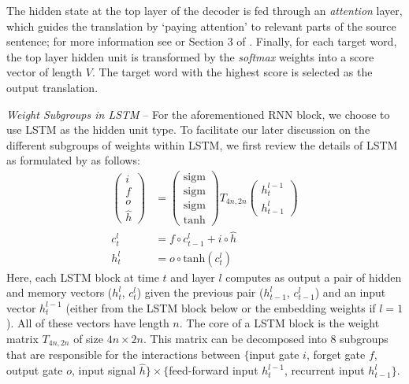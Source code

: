 The hidden state at the top layer of the decoder is fed through an
\textit{attention} layer, which guides the translation by `paying attention' to relevant parts of the source sentence; 
for more information see \cite{bog15} or Section 3 of \cite{luong15attn}.
Finally, for each target word, the top layer hidden unit is transformed by the
\emph{softmax} weights into a score vector of length $V$. The target word with the highest score is selected as the output translation.

{\it Weight Subgroups in LSTM} -- For the aforementioned RNN block, we choose to
use LSTM as the hidden unit type. To facilitate our later discussion 
on the different subgroups of weights
within LSTM, we first review the details of LSTM as formulated by 
 as follows:
\begin{align}
\begin{pmatrix}
i\\
f\\
o\\
\hat{h}
\end{pmatrix}
&=
\begin{pmatrix}
\text{sigm}\\
\text{sigm}\\
\text{sigm}\\
\text{tanh}
\end{pmatrix}
T_{4n,2n}
\begin{pmatrix}
h_t^{l-1}\\
h_{t-1}^l
\end{pmatrix} \label{eqn:lstm_1} \\
c_t^l&=f \circ c_{t-1}^l + i \circ \hat{h} \label{eqn:lstm_2} \\
h_t^l &= o \circ \text{tanh}(c_t^l) \label{eqn:lstm_3}
\end{align}
Here, each LSTM block at time $t$ and layer $l$ computes as output a pair of
hidden and memory vectors ($h_t^l$, $c_t^l$) given the previous pair
($h_{t-1}^l$, $c_{t-1}^l$) and an input vector $h_t^{l-1}$ (either from the LSTM block below or
the embedding weights if $l\!=\!1$). All of these vectors
have length $n$.
The core of a LSTM block is the weight matrix $T_{4n,2n}$ of size $4n \times
2n$. This matrix can be decomposed into 8 subgroups that are responsible for the
interactions between $\{$input gate $i$, forget gate $f$, output gate $o$,
input signal $\hat{h}\} \times \{$feed-forward input $h_t^{l-1}$, recurrent
input $h_{t-1}^l\}$.

